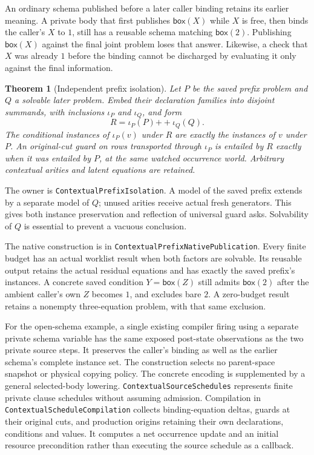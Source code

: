 \documentclass[11pt]{article}
\newtheorem{theorem}{Theorem}
\newcommand{\code}[1]{\texttt{\small #1}}
\begin{document}
An ordinary schema published before a later caller binding retains its
earlier meaning. A private body that first publishes
$\mathsf{box}(X)$ while $X$ is free, then binds the caller's $X$ to $1$,
still has a reusable schema matching $\mathsf{box}(2)$. Publishing
$\mathsf{box}(X)$ against the final joint problem loses that answer.
Likewise, a check that $X$ was already $1$ before the binding cannot be
discharged by evaluating it only against the final information.

\begin{theorem}[Independent prefix isolation]
Let $P$ be the saved prefix problem and $Q$ a solvable later problem.
Embed their declaration families into disjoint summands, with inclusions
$\iota_P$ and $\iota_Q$, and form
\[
 R=\iota_P(P)\mathbin{+\!+}\iota_Q(Q).
\]
The conditional instances of $\iota_P(v)$ under $R$ are exactly the
instances of $v$ under $P$. An original-cut guard on rows transported
through $\iota_P$ is entailed by $R$ exactly when it was entailed by $P$,
at the same watched occurrence world. Arbitrary contextual arities and
latent equations are retained.
\end{theorem}
The owner is \code{ContextualPrefixIsolation}. A model of the saved
prefix extends by a separate model of $Q$; unused arities receive actual
fresh generators. This gives both instance preservation and reflection
of universal guard asks. Solvability of $Q$ is essential to prevent a
vacuous conclusion.

The native construction is in \code{ContextualPrefixNativePublication}.
Every finite budget has an actual worklist result when both factors are
solvable. Its reusable output retains the actual residual equations and
has exactly the saved prefix's instances. A concrete saved condition
$Y=\mathsf{box}(Z)$ still admits $\mathsf{box}(2)$ after the ambient
caller's own $Z$ becomes $1$, and excludes bare $2$. A zero-budget result
retains a nonempty three-equation problem, with that same exclusion.

For the open-schema example, a single existing compiler firing using a
separate private schema variable has the same exposed post-state
observations as the two private source steps. It preserves the caller's
binding as well as the earlier schema's complete instance set. The
construction selects no parent-space snapshot or physical copying policy.
The concrete encoding is supplemented by a general selected-body lowering.
\code{ContextualSourceSchedules} represents finite private clause schedules
without assuming admission. Compilation in
\code{ContextualScheduleCompilation} collects binding-equation deltas,
guards at their original cuts, and production origins retaining their own
declarations, conditions and values. It computes a net occurrence update
and an initial resource precondition rather than executing the source
schedule as a callback.
\end{document}
